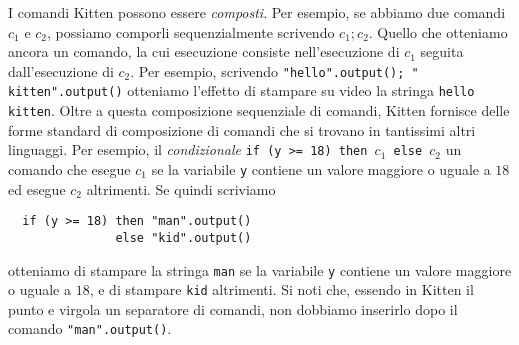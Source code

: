 I comandi Kitten
possono essere \emph{composti}. Per esempio, se abbiamo due comandi
$c_1$ e $c_2$, possiamo comporli sequenzialmente
scrivendo $c_1;c_2$. Quello che otteniamo
\e ancora un comando, la cui esecuzione consiste nell'esecuzione di $c_1$
seguita dall'esecuzione di $c_2$. Per esempio, scrivendo
\verb|"hello".output(); " kitten".output()| otteniamo l'effetto di
stampare su video la stringa \texttt{hello kitten}. Oltre a questa
composizione sequenziale di comandi, Kitten fornisce delle forme
standard di composizione di comandi che si trovano in tantissimi altri
linguaggi. Per esempio, il \emph{condizionale}
\texttt{if (y >= 18) then }$c_1$\texttt{ else }$c_2$
\e un comando che esegue $c_1$ se la variabile \texttt{y} contiene un valore
maggiore o uguale a $18$ ed esegue $c_2$ altrimenti. Se quindi scriviamo
%
\begin{verbatim}
  if (y >= 18) then "man".output()
               else "kid".output()
\end{verbatim}
%
otteniamo di stampare la stringa \texttt{man} se la variabile \texttt{y}
contiene un valore maggiore o uguale a $18$, e di stampare
\texttt{kid} altrimenti.
Si noti che, essendo in Kitten il punto e virgola un separatore di comandi,
non dobbiamo inserirlo dopo il comando \verb|"man".output()|.

